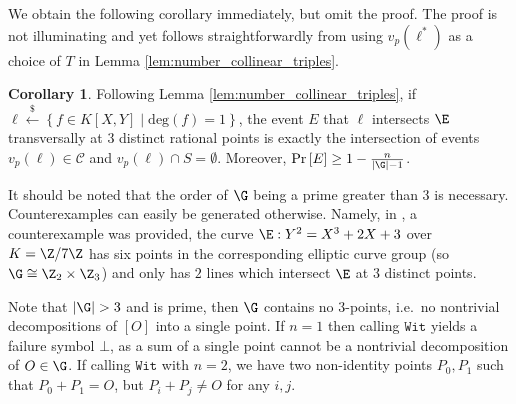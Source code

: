 \documentclass[11pt,letterpaper]{article}
\theoremstyle{definition}
\newtheorem{corollary}[theorem]{Corollary}
\newcommand{\6}{\mathbf}
\newcommand{\7}{\mathcal}
\newcommand{\lsamp}{\xleftarrow{\$}}
\begin{document}
We obtain the following corollary immediately, but omit the proof. The proof is not illuminating and yet follows straightforwardly from using $v_p(\ell^*)$ as a choice of $T$ in Lemma \ref{lem:number_collinear_triples}.

\begin{corollary}
\label{cor:prob_collinear_triples}
Following Lemma \ref{lem:number_collinear_triples}, if  $\ell \lsamp \left\{f \in K[X,Y] \mid \text{deg}(f) = 1\right\}$, the event $E$ that $\ell$ intersects $\E$ transversally at $3$ distinct rational points is exactly the intersection of events $v_p(\ell) \in \mathcal{C}$ and $v_p(\ell) \cap S = \emptyset$. Moreover, $\text{Pr}\left[E\right] \geq 1-\frac{n}{\left|\G\right|-1}$.
\end{corollary}

It should be noted that the order of $\G$ being a prime greater than $3$ is necessary. Counterexamples can easily be generated otherwise. Namely, in \cite{bassapersonal}, a counterexample was provided,  the curve $\E: Y^2 = X^3 + 2X + 3$ over $K=\Z/7\Z$ has six points in the corresponding elliptic curve group (so $\G \cong \Z_2 \times \Z_3$) and only has $2$ lines which intersect $\E$ at $3$ distinct points.

Note that $\left|\G\right| > 3$ and is prime, then $\G$ contains no $3$-points, i.e.\ no nontrivial decompositions of $[O]$ into a single point. If $n=1$ then calling $\texttt{Wit}$ yields a failure symbol $\bot$, as a sum of a single point cannot be a nontrivial decomposition of $O \in \G$. If calling $\texttt{Wit}$ with $n = 2$, we have two non-identity points $P_0, P_1$ such that $P_0 + P_1 = O$, but $P_i + P_j \neq O$ for any $i,j$.
\end{document}
